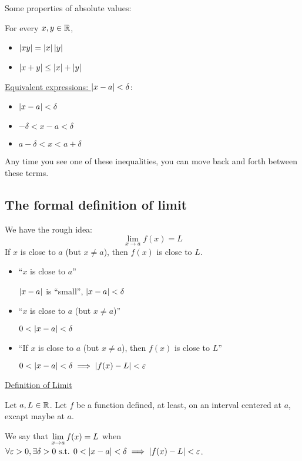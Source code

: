 Some properties of absolute values:

For every \(x, y \in \mathbb{R}\),

\begin{itemize}
  \item \(\left|xy\right| = \left|x\right| \left|y\right|\)
  \item \(\left|x + y\right| \leq \left|x\right| + \left|y\right|\)
\end{itemize}

\underline{Equivalent expressions: \(\left|x - a\right| < \delta\)}:


\begin{itemize}
  \item \(\left|x - a\right| < \delta\)
  \item \(- \delta < x - a < \delta\)
  \item \(a - \delta < x < a + \delta\)
\end{itemize}

Any time you see one of these inequalities, you can move back and forth between these terms.

\subsection{The formal definition of limit}

We have the rough idea:
\[\lim_{x \to a} f(x) = L\]
If \(x\) is close to \(a\) (but \(x \neq a\)), then \(f(x)\) is close to \(L\).

\begin{itemize}
  \item ``\(x\) is close to \(a\)''

        \(\left|x - a\right|\) is ``small'', \quad \(\left|x - a\right| < \delta\)

  \item ``\(x\) is close to \(a\) (but \(x \neq a\))''

        \(0 < \left|x - a\right| < \delta\)

  \item ``If \(x\) is close to \(a\) (but \(x \neq a\)), then \(f(x)\) is close to \(L\)''

        \(0 < \left|x - a\right| < \delta \implies \left|f(x) - L\right| < \varepsilon\)
\end{itemize}

\begin{mdframed}

  \underline{Definition of Limit}

  Let \(a, L \in \mathbb{R}\). Let \(f\) be a function defined, at least, on an interval centered at \(a\), excapt maybe at \(a\).

  We say that \(\displaystyle \lim_{x \to a} f(x) = L\) when \(\forall \varepsilon > 0, \exists \delta > 0 \text{ s.t. } 0 < \left|x - a\right| < \delta \implies \left|f(x) - L\right| < \varepsilon\).

\end{mdframed}

